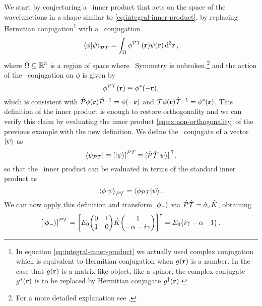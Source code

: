             We start by conjecturing \cite{bender2024} a \PT\ inner product that acts on the space of the wavefunctions in a shape similar to \eqref{eq:integral-inner-product}, by replacing Hermitian conjugation\footnote{In equation \eqref{eq:integral-inner-product} we actually used complex conjugation which is equivalent to Hermitian conjugation when $g\pqty{\vb{r}}$ is a number. In the case that $g\pqty{\vb{r}}$ is a matrix-like object, like a spinor, the complex conjugate $g^*\pqty{\vb{r}}$ is to be replaced by Hermitian conjugate $g^\dag\pqty{\vb{r}}$.} with a \PT\ conjugation
            \begin{equation}
                \label{eq:PT-inner-product-integral}
                \braket{\phi}{\psi}_{\PT} = \int\nolimits_{\Omega} \phi^{\PT}\pqty{\vb{r}} \psi\pqty{\vb{r}} \dd[3]{\vb{r}}
                \mycomma
            \end{equation}
            where $\Omega\subseteq\mathbb{R}^3$ is a region of space where \PT\ Symmetry is unbroken,\footnote{For a more detailed explanation see .} and the action of the \PT\ conjugation on $\phi$ is given by
            \begin{equation*}
                \phi^{\PT}\pqty{\vb{r}} \equiv \phi^*\pqty{-\vb{r}}
                \mycomma
            \end{equation*}
            which is consistent with $\hP \phi\pqty{\vb{r}} \hP^{-1} = \phi\pqty{{-\vb{r}}}$ and $\hT \phi\pqty{\vb{r}} \hT^{-1} = \phi^*\pqty{{\vb{r}}}$. This definition of the inner product is enough to restore orthogonality and we can verify this claim by evaluating the inner product \eqref{eq:ex:non-orthogonality} of the previous example with the new definition. We define the \PT\ conjugate of a vector $\ket{\psi}$ as
            \begin{equation}
                \bra{\psi_{\PT}}
                \equiv \bqty{\ket{\psi}}^{\PT}
                \equiv \bqty*{\hP\hT\!\ket{\psi}}^\intercal
                \mycomma
            \end{equation}
            so that the \PT\ inner product can be evaluated in terms of the standard inner product as 
            \begin{equation}
                \label{eq:pt-conjugation}
                \braket{\phi}{\psi}_{\mathcal{P}\mathcal{T}} = \braket{\phi_{\mathcal{P}\mathcal{T}}}{\psi}
                \text{.}
            \end{equation}
            We can now apply this definition and transform $\ket{\phi_-}$ via $\mathcal{\hat{P}}\mathcal{\hat{T}} = \hat{\sigma}_x \hat{K}$, obtaining
            \begin{equation*}
                \bqty{\ket{\phi_-}}^{\PT}
                = \bqty{E_0\! \pmqty{\admat[0]{1,1}}\! \hK\! \pmqty{1 \\ -\alpha - i \gamma }}^\intercal
                = E_0\! \pmqty{i \gamma - \alpha & 1}
                \myperiod
            \end{equation*}
